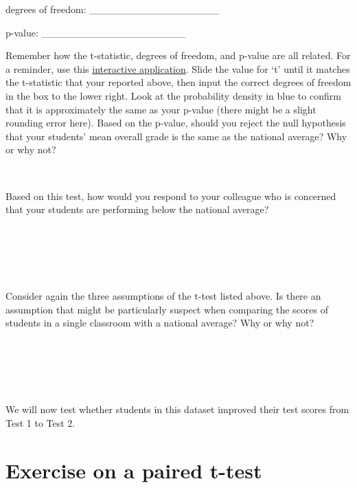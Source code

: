 \documentclass[
]{scrbook}
\begin{document}
degrees of freedom: \_\_\_\_\_\_\_\_\_\_\_\_\_\_\_\_\_\_

p-value: \_\_\_\_\_\_\_\_\_\_\_\_\_\_\_\_\_\_\_\_

Remember how the t-statistic, degrees of freedom, and p-value are all related.
For a reminder, use this \href{https://bradduthie.shinyapps.io/t_score/}{interactive application}.
Slide the value for `t' until it matches the t-statistic that your reported above, then input the correct degrees of freedom in the box to the lower right.
Look at the probability density in blue to confirm that it is approximately the same as your p-value (there might be a slight rounding error here).
Based on the p-value, should you reject the null hypothesis that your students' mean overall grade is the same as the national average? Why or why not?

\begin{verbatim}


\end{verbatim}

Based on this test, how would you respond to your colleague who is concerned that your students are performing below the national average?

\begin{verbatim}





\end{verbatim}

Consider again the three assumptions of the t-test listed above.
Is there an assumption that might be particularly suspect when comparing the scores of students in a single classroom with a national average? Why or why not?

\begin{verbatim}





\end{verbatim}

We will now test whether students in this dataset improved their test scores from Test 1 to Test 2.

\hypertarget{exercise-on-a-paired-t-test}{%
\section{Exercise on a paired t-test}\label{exercise-on-a-paired-t-test}}
\end{document}
